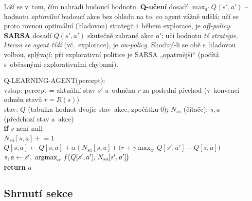 \begin{intuice}
Liší se v~tom, čím nahradí budoucí hodnotu. \textbf{Q-učení} dosadí $\max_{a'}Q(s',a')$ -- hodnotu \emph{optimální} budoucí akce bez ohledu na to, co agent vážně udělá; učí se proto rovnou optimální (hladovou) strategii i~během explorace, je \emph{off-policy}. \textbf{SARSA} dosadí $Q(s',a')$ skutečně zahrané akce $a'$; učí hodnotu \emph{té strategie, kterou se agent řídí} (vč.\ explorace), je \emph{on-policy}. Shodují-li se obě s~hladovou volbou, splývají; při explorativní politice je SARSA „opatrnější`` (počítá s~občasnými explorativními chybami).
\end{intuice}

\begin{algo}
\ttfamily\small
Q-LEARNING-AGENT(percept):\\
\hspace*{1.5em}vstup: percept = aktuální stav $s'$ a~odměna $r$ za poslední přechod (v~konvenci odměn stavů $r=R(s)$)\\
\hspace*{1.5em}stav: $Q$ (tabulka hodnot dvojic stav--akce, zpočátku 0); $N_{sa}$ (čítače); $s,a$ (předchozí stav a~akce)\\
\hspace*{1.5em}\textbf{if} $s$ není null:\\
\hspace*{3em}$N_{sa}[s,a] \mathrel{+}{=} 1$\\
\hspace*{3em}$Q[s,a] \leftarrow Q[s,a] + \alpha(N_{sa}[s,a])\,\big(r + \gamma\max_{a'}Q[s',a'] - Q[s,a]\big)$\\
\hspace*{1.5em}$s,a \leftarrow s',\ \operatorname*{argmax}_{a'} f\big(Q[s',a'],\,N_{sa}[s',a']\big)$ \\
\hspace*{1.5em}\textbf{return} $a$
\end{algo}

\subsection{Shrnutí sekce}


